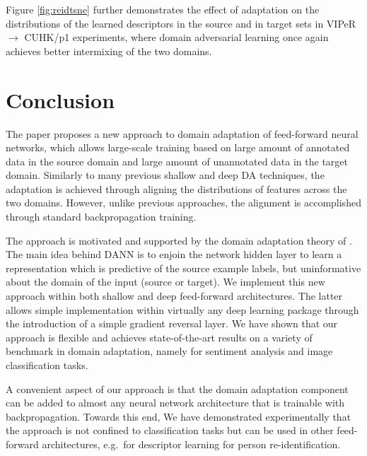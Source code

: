 Figure \ref{fig:reidtsne} further demonstrates the effect of adaptation on the distributions of the learned descriptors in the source and in target sets in VIPeR $\rightarrow$ CUHK/p1 experiments, where domain adversarial learning once again achieves better intermixing of the two domains.


\section{Conclusion}

The paper proposes a new approach to domain adaptation of feed-forward neural networks, which allows large-scale training based on large amount of annotated data in the source domain and large amount of unannotated data in the target domain. Similarly to many previous shallow and deep DA techniques, the adaptation is achieved through aligning the distributions of features across the two domains. However, unlike previous approaches, the alignment is accomplished through standard backpropagation training.

The approach is motivated and supported by the domain adaptation theory of \citet{BenDavid-NIPS06,BenDavid-MLJ2010}. 
The main idea behind DANN is to enjoin the network hidden layer to learn a representation which is predictive of the source example labels, but uninformative about the domain of the input (source or target). 
We implement this new approach within both shallow and deep feed-forward architectures. The latter allows simple implementation within virtually any deep learning package through the introduction of a simple gradient reversal layer. 
We have shown that our approach is flexible and achieves state-of-the-art results on a variety of benchmark in domain adaptation, namely for sentiment analysis and image classification tasks. 

A convenient aspect of our approach is that the domain adaptation component can be added to almost any neural network architecture that is trainable with backpropagation. Towards this end, We have demonstrated experimentally that the approach is not confined to classification tasks but can be used in other feed-forward architectures, e.g.\ for descriptor learning for person re-identification.